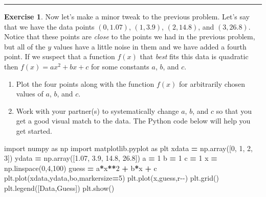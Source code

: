 \documentclass[
]{book}
\newenvironment{Shaded}{\begin{snugshade}}{\end{snugshade}}
\newcommand{\DecValTok}[1]{\textcolor[rgb]{0.00,0.00,0.81}{#1}}
\newcommand{\FloatTok}[1]{\textcolor[rgb]{0.00,0.00,0.81}{#1}}
\newcommand{\ImportTok}[1]{#1}
\newcommand{\NormalTok}[1]{#1}
\newcommand{\OperatorTok}[1]{\textcolor[rgb]{0.81,0.36,0.00}{\textbf{#1}}}
\newcommand{\StringTok}[1]{\textcolor[rgb]{0.31,0.60,0.02}{#1}}
\theoremstyle{definition}
\theoremstyle{definition}
\theoremstyle{definition}
\newtheorem{exercise}{Exercise}[chapter]
\theoremstyle{remark}
\begin{document}
\begin{center}\rule{0.5\linewidth}{0.5pt}\end{center}

\begin{exercise}
\protect\hypertarget{exr:first-least-squares}{}{\label{exr:first-least-squares} }Now let's make a minor tweak to the previous problem. Let's say that we
have the data points \((0,1.07)\), \((1,3.9)\), \((2,14.8)\), and \((3,26.8)\).
Notice that these points are \emph{close} to the points we had in the
previous problem, but all of the \(y\) values have a little noise in them
and we have added a fourth point. If we suspect that a function \(f(x)\)
that \emph{best} fits this data is quadratic then \(f(x) = ax^2 +  bx + c\) for some constants \(a\), \(b\), and \(c\).

\begin{enumerate}
\def\labelenumi{\alph{enumi}.}
\item
  Plot the four points along with the function \(f(x)\) for arbitrarily
  chosen values of \(a\), \(b\), and \(c\).
\item
  Work with your partner(s) to systematically change \(a\), \(b\), and \(c\) so that you get a good visual match to the data. The Python code below will help you get started.
\end{enumerate}
\end{exercise}

\begin{Shaded}
\begin{Highlighting}[]
\ImportTok{import}\NormalTok{ numpy }\ImportTok{as}\NormalTok{ np}
\ImportTok{import}\NormalTok{ matplotlib.pyplot }\ImportTok{as}\NormalTok{ plt}
\NormalTok{xdata }\OperatorTok{=}\NormalTok{ np.array([}\DecValTok{0}\NormalTok{, }\DecValTok{1}\NormalTok{, }\DecValTok{2}\NormalTok{, }\DecValTok{3}\NormalTok{])}
\NormalTok{ydata }\OperatorTok{=}\NormalTok{ np.array([}\FloatTok{1.07}\NormalTok{, }\FloatTok{3.9}\NormalTok{, }\FloatTok{14.8}\NormalTok{, }\FloatTok{26.8}\NormalTok{])}
\NormalTok{a }\OperatorTok{=} \DecValTok{1}
\NormalTok{b }\OperatorTok{=} \DecValTok{1}
\NormalTok{c }\OperatorTok{=} \DecValTok{1}
\NormalTok{x }\OperatorTok{=}\NormalTok{ np.linspace(}\DecValTok{0}\NormalTok{,}\DecValTok{4}\NormalTok{,}\DecValTok{100}\NormalTok{)}
\NormalTok{guess }\OperatorTok{=}\NormalTok{ a}\OperatorTok{*}\NormalTok{x}\OperatorTok{**}\DecValTok{2} \OperatorTok{+}\NormalTok{ b}\OperatorTok{*}\NormalTok{x }\OperatorTok{+}\NormalTok{ c}
\NormalTok{plt.plot(xdata,ydata,}\StringTok{\textquotesingle{}bo\textquotesingle{}}\NormalTok{,markersize}\OperatorTok{=}\DecValTok{5}\NormalTok{)}
\NormalTok{plt.plot(x,guess,}\StringTok{\textquotesingle{}r{-}{-}\textquotesingle{}}\NormalTok{)}
\NormalTok{plt.grid()}
\NormalTok{plt.legend([}\StringTok{\textquotesingle{}Data\textquotesingle{}}\NormalTok{,}\StringTok{\textquotesingle{}Guess\textquotesingle{}}\NormalTok{])}
\NormalTok{plt.show()}
\end{Highlighting}
\end{Shaded}
\end{document}
